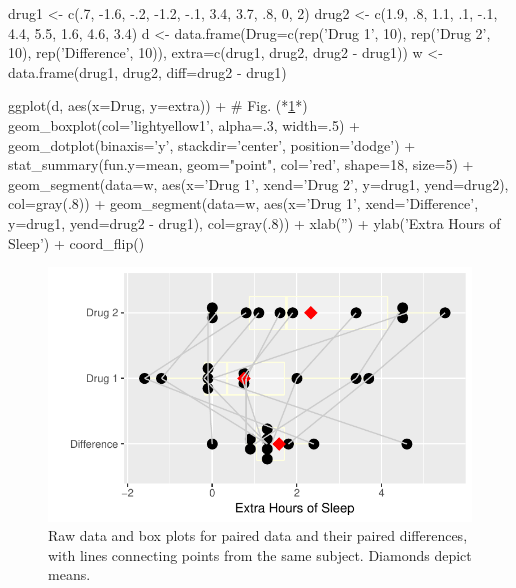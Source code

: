 \begin{Schunk}
\begin{Sinput}
drug1 <- c(.7, -1.6, -.2, -1.2, -.1, 3.4, 3.7, .8, 0, 2)
drug2 <- c(1.9, .8, 1.1, .1, -.1, 4.4, 5.5, 1.6, 4.6, 3.4)
d <- data.frame(Drug=c(rep('Drug 1', 10), rep('Drug 2', 10),
                  rep('Difference', 10)),
                extra=c(drug1, drug2, drug2 - drug1))
w <- data.frame(drug1, drug2, diff=drug2 - drug1)

ggplot(d, aes(x=Drug, y=extra)) +   # Fig. (*\ref{fig:htest-tplot}*)
  geom_boxplot(col='lightyellow1', alpha=.3, width=.5) + 
  geom_dotplot(binaxis='y', stackdir='center', position='dodge') +
  stat_summary(fun.y=mean, geom="point", col='red', shape=18, size=5) +
  geom_segment(data=w, aes(x='Drug 1', xend='Drug 2', y=drug1, yend=drug2),
               col=gray(.8)) +
  geom_segment(data=w, aes(x='Drug 1', xend='Difference', y=drug1, yend=drug2 - drug1),
               col=gray(.8)) +
  xlab('') + ylab('Extra Hours of Sleep') + coord_flip() 
\end{Sinput}
\begin{figure}[htbp]

\centerline{\includegraphics{htest-tplot-1} }

\caption[Data and box plots for paired data]{Raw data and box plots for paired data and their paired differences, with lines connecting points from the same subject.  Diamonds depict means.}\label{fig:htest-tplot}
\end{figure}
\end{Schunk}

